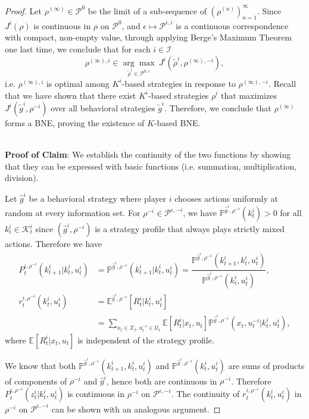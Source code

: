 \documentclass[pdflatex,sn-basic]{sn-jnl}
\newcommand{\E}{\mathbb{E}}
\renewcommand{\Pr}{\mathbb{P}}
\newcommand{\Comp}{K}
\newcommand{\comp}{k}
\newcommand{\Compset}{\mathcal{K}}
\theoremstyle{thmstyleone}%
\theoremstyle{thmstyletwo}%
\theoremstyle{thmstylethree}%
\begin{document}
\begin{appendices}
\begin{proof}
	Let $\rho^{(\infty)} \in \mathcal{P}^0$ be the limit of a sub-sequence of $(\rho^{(n)})_{n=1}^{\infty}$. Since $J^i(\rho)$ is continuous in $\rho$ on $\mathcal{P}^0$, and $\epsilon \mapsto \mathcal{P}^{\epsilon, i}$ is a continuous correspondence with compact, non-empty value, through applying Berge's Maximum Theorem \citep{sundaram1996first} one last time, we conclude that for each $i\in \mathcal{I}$
	\begin{equation}
		\rho^{(\infty), i} \in \underset{\tilde{\rho}^i\in \mathcal{P}^{0, i}}{\arg\max}~J^i(\tilde{\rho}^i, \rho^{(\infty), -i}),
	\end{equation}
	i.e. $\rho^{(\infty), i}$ is optimal among $\Comp^i$-based strategies in response to $\rho^{(\infty), -i}$. Recall that we have shown that there exist $\Comp^i$-based strategies $\rho^i$ that maximizes $J^i(\tilde{g}^i, \rho^{-i})$ over all behavioral strategies $\tilde{g}^i$. Therefore, we conclude that $\rho^{(\infty)}$ forms a BNE, proving the existence of $\Comp$-based BNE.\\~
	
	\textbf{Proof of Claim}: 
    {We establish the continuity of the two functions by showing that they can be expressed with basic functions (i.e. summation, multiplication, division).}
 
	Let $\hat{g}^i$ be a behavioral strategy where player $i$ chooses actions uniformly at random at every information set. For $\rho^{-i} \in\mathcal{P}^{\epsilon, -i}$, we have $\Pr^{\hat{g}^i, \rho^{-i}}(\comp_t^i) > 0$ for all $\comp_t^i\in\Compset_t^i$ since $(\hat{g}^i, \rho^{-i})$ is a strategy profile that always plays strictly mixed actions. Therefore we have
	\begin{align}
		P_t^{i, \rho^{-i}}(\comp_{t+1}^i|\comp_t^i, u_t^i) &= \Pr^{\hat{g}^i, \rho^{-i}}(\comp_{t+1}^i| \comp_t^i, u_t^i) = \dfrac{\Pr^{\hat{g}^i, \rho^{-i}}(\comp_{t+1}^i, \comp_t^i, u_t^i) }{\Pr^{\hat{g}^i, \rho^{-i}}(\comp_t^i, u_t^i)},\\
		r_t^{i, \rho^{-i}}(\comp_t^i, u_t^i) &= \E^{\hat{g}^i, \rho^{-i}}[R_t^i| \comp_t^i, u_t^i] \\
		&=\sum_{x_t\in \mathcal{X}_t, u_t^{-i}\in\mathcal{U}_t } \E[R_t^i| x_t, u_t] \Pr^{\hat{g}^i, \rho^{-i}}(x_t, u_t^{-i}| \comp_t^i, u_t^i),
	\end{align}
	where $\E[R_t^i| x_t, u_t]$ is independent of the strategy profile.
	
	We know that both $\Pr^{\hat{g}^i, \rho^{-i}}(\comp_{t+1}^i, \comp_t^i, u_t^i)$ and $\Pr^{\hat{g}^i, \rho^{-i}}(\comp_t^i, u_t^i)$ are sums of products of components of $\rho^{-i}$ and $\hat{g}^i$, hence both are continuous in $\rho^{-i}$. Therefore $P_t^{i, \rho^{-i}}(z_{t}^i|\comp_t^i, u_t^i)$ is continuous in $\rho^{-i}$ on $\mathcal{P}^{\epsilon, -i}$. The continuity of $r_t^{i, \rho^{-i}}(\comp_t^i, u_t^i)$ in $\rho^{-i}$ on $\mathcal{P}^{\epsilon, -i}$  can be shown with an analogous argument.


\end{proof}
\end{appendices}
\end{document}
